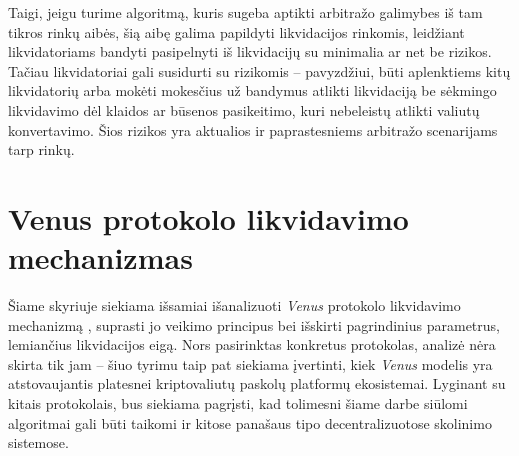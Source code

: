 \documentclass[]{VUMIFTemplateClass}
\begin{document}
Taigi, jeigu turime algoritmą, kuris sugeba aptikti arbitražo galimybes iš tam tikros rinkų aibės, šią aibę galima papildyti likvidacijos rinkomis, leidžiant likvidatoriams bandyti pasipelnyti iš likvidacijų su minimalia ar net be rizikos. Tačiau likvidatoriai gali susidurti su rizikomis -- pavyzdžiui, būti aplenktiems kitų likvidatorių arba mokėti mokesčius už bandymus atlikti likvidaciją be sėkmingo likvidavimo dėl klaidos ar būsenos pasikeitimo, kuri nebeleistų atlikti valiutų konvertavimo. Šios rizikos yra aktualios ir paprastesniems arbitražo scenarijams tarp rinkų.

\section{Venus protokolo likvidavimo mechanizmas}
\label{sec:venus_mechanizmas}

Šiame skyriuje siekiama išsamiai išanalizuoti \textit{Venus} protokolo likvidavimo mechanizmą \cite{venusprotocolcode}, suprasti jo veikimo principus bei išskirti pagrindinius parametrus, lemiančius likvidacijos eigą. Nors pasirinktas konkretus protokolas, analizė nėra skirta tik jam – šiuo tyrimu taip pat siekiama įvertinti, kiek \textit{Venus} modelis yra atstovaujantis platesnei kriptovaliutų paskolų platformų ekosistemai. Lyginant su kitais protokolais, bus siekiama pagrįsti, kad tolimesni šiame darbe siūlomi algoritmai gali būti taikomi ir kitose panašaus tipo decentralizuotose skolinimo sistemose.
\end{document}
